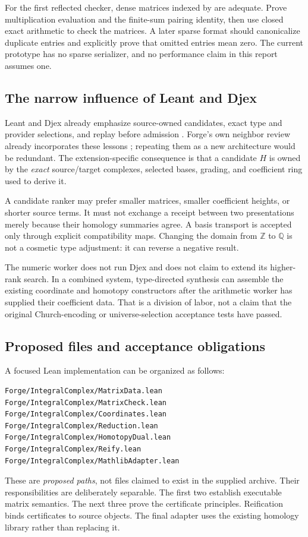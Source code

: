\documentclass[11pt,letterpaper]{article}
\theoremstyle{definition}\newtheorem{definition}[theorem]{Definition}
\theoremstyle{remark}\newtheorem{remark}[theorem]{Remark}
\newcommand{\Z}{\mathbb Z}\newcommand{\Q}{\mathbb Q}
\newcommand{\code}[1]{\texttt{\detokenize{#1}}}
\begin{document}
For the first reflected checker, dense matrices indexed by \code{Fin} are
adequate. Prove multiplication evaluation and the finite-sum pairing identity,
then use closed exact arithmetic to check the matrices. A later sparse format
should canonicalize duplicate entries and explicitly prove that omitted
entries mean zero. The current prototype has no sparse serializer, and no
performance claim in this report assumes one.

\subsection{The narrow influence of Leant and Djex}
Leant and Djex already emphasize source-owned candidates, exact type and
provider selections, and replay before admission \cite{leant,djex}.
Forge's own neighbor review already incorporates these lessons
\cite{forge-neighbors}; repeating them as a new architecture would be redundant.
The extension-specific consequence is that a candidate $H$ is owned by the
\emph{exact} source/target complexes, selected bases, grading, and coefficient
ring used to derive it.

A candidate ranker may prefer smaller matrices, smaller coefficient heights, or
shorter source terms. It must not exchange a receipt between two presentations
merely because their homology summaries agree. A basis transport is accepted
only through explicit compatibility maps. Changing the domain from $\Z$ to
$\Q$ is not a cosmetic type adjustment: it can reverse a negative result.

The numeric worker does not run Djex and does not claim to extend its higher-rank
search. In a combined system, type-directed synthesis can assemble the existing
coordinate and homotopy constructors after the arithmetic worker has supplied
their coefficient data. That is a division of labor, not a claim that the
original Church-encoding or universe-selection acceptance tests have passed.

\subsection{Proposed files and acceptance obligations}
A focused Lean implementation can be organized as follows:
\begin{lstlisting}
Forge/IntegralComplex/MatrixData.lean
Forge/IntegralComplex/MatrixCheck.lean
Forge/IntegralComplex/Coordinates.lean
Forge/IntegralComplex/Reduction.lean
Forge/IntegralComplex/HomotopyDual.lean
Forge/IntegralComplex/Reify.lean
Forge/IntegralComplex/MathlibAdapter.lean
\end{lstlisting}
These are \emph{proposed paths}, not files claimed to exist in the supplied
archive. Their responsibilities are deliberately separable. The first two
establish executable matrix semantics. The next three prove the certificate
principles. Reification binds certificates to source objects. The final adapter
uses the existing homology library rather than replacing it.
\end{document}
